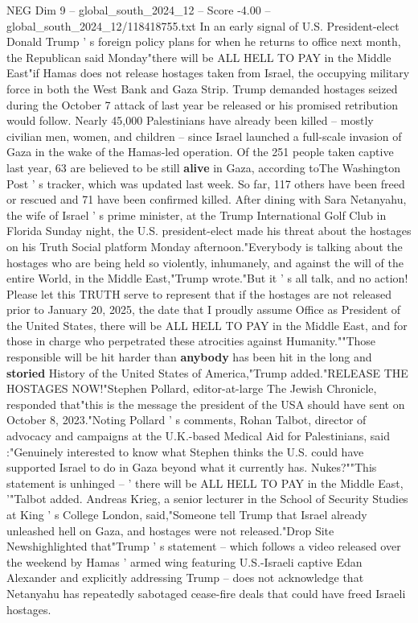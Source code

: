 \begin{textsample}{NEG Dim 9 – global\_south\_2024\_12 – Score -4.00 – global\_south\_2024\_12/118418755.txt}  \label{ex:f9_neg_214}
In an early signal of U.S.
President-elect Donald Trump ' s foreign policy plans for when he returns to office next month, the Republican said Monday"there will be ALL HELL TO PAY in the Middle East"if Hamas does not release hostages taken from Israel, the occupying military force in both the West Bank and Gaza Strip.
Trump demanded hostages seized during the October 7 attack of last year be released or his promised retribution would follow.
Nearly 45,000 Palestinians have already been killed -- mostly civilian men, women, and children -- since Israel launched a full-scale invasion of Gaza in the wake of the Hamas-led operation.
Of the 251 people taken captive last year, 63 are believed to be still \textbf{alive} in Gaza, according toThe Washington Post ' s tracker, which was updated last week.
So far, 117 others have been freed or rescued and 71 have been confirmed killed.
After dining with Sara Netanyahu, the wife of Israel ' s prime minister, at the Trump International Golf Club in Florida Sunday night, the U.S. president-elect made his threat about the hostages on his Truth Social platform Monday afternoon."Everybody is talking about the hostages who are being held so violently, inhumanely, and against the will of the entire World, in the Middle East,"Trump wrote."But it ' s all talk, and no action!
Please let this TRUTH serve to represent that if the hostages are not released prior to January 20, 2025, the date that I proudly assume Office as President of the United States, there will be ALL HELL TO PAY in the Middle East, and for those in charge who perpetrated these atrocities against Humanity.""Those responsible will be hit harder than \textbf{anybody} has been hit in the long and \textbf{storied} History of the United States of America,"Trump added."RELEASE THE HOSTAGES NOW!"Stephen Pollard, editor-at-large The Jewish Chronicle, responded that"this is the message the president of the USA should have sent on October 8, 2023."Noting Pollard ' s comments, Rohan Talbot, director of advocacy and campaigns at the U.K.-based Medical Aid for Palestinians, said :"Genuinely interested to know what Stephen thinks the U.S. could have supported Israel to do in Gaza beyond what it currently has.
Nukes?""This statement is unhinged -- ' there will be ALL HELL TO PAY in the Middle East, '"Talbot added.
Andreas Krieg, a senior lecturer in the School of Security Studies at King ' s College London, said,"Someone tell Trump that Israel already unleashed hell on Gaza, and hostages were not released."Drop Site Newshighlighted that"Trump ' s statement -- which follows a video released over the weekend by Hamas ' armed wing featuring U.S.-Israeli captive Edan Alexander and explicitly addressing Trump -- does not acknowledge that Netanyahu has repeatedly sabotaged cease-fire deals that could have freed Israeli hostages.

\end{textsample}
